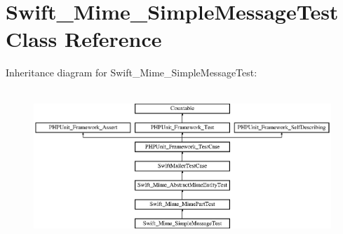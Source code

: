 \section{Swift\+\_\+\+Mime\+\_\+\+Simple\+Message\+Test Class Reference}
\label{class_swift___mime___simple_message_test}
Inheritance diagram for Swift\+\_\+\+Mime\+\_\+\+Simple\+Message\+Test\+:\begin{figure}[H]
\begin{center}
\leavevmode
\includegraphics[height=5.781711cm]{class_swift___mime___simple_message_test}
\end{center}
\end{figure}
